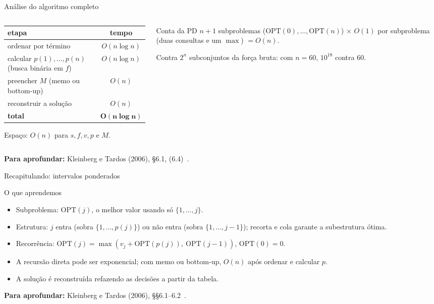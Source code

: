 \documentclass[aspectratio=169,xcolor=table]{beamer}
\newcommand{\fonte}[1]{%
  \vfill
  {\tiny\color{gray!55!black}\textbf{Para aprofundar:} #1\par}%
}
\begin{document}
\begin{frame}{Análise do algoritmo completo}
  \begin{columns}[c]
    \begin{column}{0.54\textwidth}
      \scriptsize
      \begin{tabular}{lc}
        \toprule
        etapa & tempo \\
        \midrule
        ordenar por término & $O(n\log n)$ \\
        calcular $p(1),\dots,p(n)$ (busca binária em $f$) & $O(n\log n)$ \\
        preencher $M$ (memo ou bottom-up) & $O(n)$ \\
        reconstruir a solução & $O(n)$ \\
        \midrule
        \textbf{total} & $\boldsymbol{O(n\log n)}$ \\
        \bottomrule
      \end{tabular}
      \medskip

      Espaço: $O(n)$ para $s, f, v, p$ e $M$.
    \end{column}
    \begin{column}{0.42\textwidth}
      \begin{block}{Conta da PD}
        \scriptsize $n+1$ subproblemas ($\mathrm{OPT}(0),\dots,\mathrm{OPT}(n)$)
        $\times$ $O(1)$ por subproblema (duas consultas e um $\max$) $= O(n)$.
        \medskip

        Contra $2^n$ subconjuntos da força bruta: com $n=60$, $10^{18}$ contra $60$.
      \end{block}
    \end{column}
  \end{columns}
  \fonte{Kleinberg e Tardos (2006), \S 6.1, (6.4)~\cite{kleinberg2006algorithm}.}
\end{frame}

\begin{frame}{Recapitulando: intervalos ponderados}
  \begin{block}{O que aprendemos}
    \begin{itemize}\scriptsize
      \item Subproblema: $\mathrm{OPT}(j)$, o melhor valor usando só $\{1,\dots,j\}$.
      \item Estrutura: $j$ entra (sobra $\{1,\dots,p(j)\}$) ou não entra (sobra
            $\{1,\dots,j-1\}$); recorta e cola garante a subestrutura ótima.
      \item Recorrência: $\mathrm{OPT}(j) = \max(v_j + \mathrm{OPT}(p(j)),\
            \mathrm{OPT}(j-1))$, $\mathrm{OPT}(0)=0$.
      \item A recursão direta pode ser exponencial; com memo ou bottom-up, $O(n)$ após
            ordenar e calcular $p$.
      \item A solução é reconstruída refazendo as decisões a partir da tabela.
    \end{itemize}
  \end{block}
  \fonte{Kleinberg e Tardos (2006), \S\S 6.1--6.2~\cite{kleinberg2006algorithm}.}
\end{frame}
\end{document}
